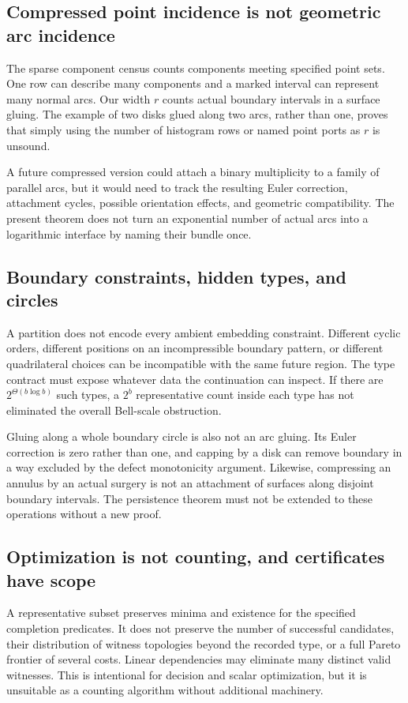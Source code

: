 \documentclass[11pt,a4paper]{article}
\theoremstyle{definition}
\theoremstyle{remark}
\begin{document}
\subsection{Compressed point incidence is not geometric arc incidence}
The sparse component census counts components meeting specified point sets. One row
can describe many components and a marked interval can represent many normal arcs.
Our width $r$ counts actual boundary intervals in a surface gluing. The example of
two disks glued along two arcs, rather than one, proves that simply using the number
of histogram rows or named point ports as $r$ is unsound.

A future compressed version could attach a binary multiplicity to a family of parallel
arcs, but it would need to track the resulting Euler correction, attachment cycles,
possible orientation effects, and geometric compatibility. The present theorem does
not turn an exponential number of actual arcs into a logarithmic interface by naming
their bundle once.

\subsection{Boundary constraints, hidden types, and circles}
A partition does not encode every ambient embedding constraint. Different cyclic
orders, different positions on an incompressible boundary pattern, or different
quadrilateral choices can be incompatible with the same future region. The type
contract must expose whatever data the continuation can inspect. If there are
$2^{\Theta(b\log b)}$ such types, a $2^b$ representative count inside each type
has not eliminated the overall Bell-scale obstruction.

Gluing along a whole boundary circle is also not an arc gluing. Its Euler correction
is zero rather than one, and capping by a disk can remove boundary in a way excluded
by the defect monotonicity argument. Likewise, compressing an annulus by an actual
surgery is not an attachment of surfaces along disjoint boundary intervals. The
persistence theorem must not be extended to these operations without a new proof.

\subsection{Optimization is not counting, and certificates have scope}
A representative subset preserves minima and existence for the specified completion
predicates. It does not preserve the number of successful candidates, their distribution
of witness topologies beyond the recorded type, or a full Pareto frontier of several
costs. Linear dependencies may eliminate many distinct valid witnesses. This is
intentional for decision and scalar optimization, but it is unsuitable as a counting
algorithm without additional machinery.
\end{document}

